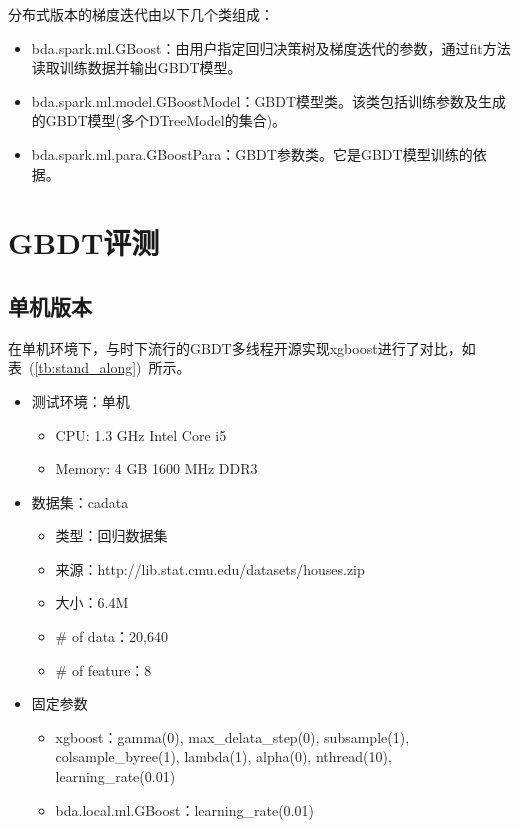 \documentclass[a4paper,11pt,         %
               ]{article}
\begin{document}
分布式版本的梯度迭代由以下几个类组成：
\begin{itemize}
	\item bda.spark.ml.GBoost：由用户指定回归决策树及梯度迭代的参数，通过fit方法读取训练数据并输出GBDT模型。
	\item bda.spark.ml.model.GBoostModel：GBDT模型类。该类包括训练参数及生成的GBDT模型(多个DTreeModel的集合)。
	\item bda.spark.ml.para.GBoostPara：GBDT参数类。它是GBDT模型训练的依据。
\end{itemize}

\section{GBDT评测}

\subsection{单机版本}

在单机环境下，与时下流行的GBDT多线程开源实现xgboost进行了对比，如表~(\ref{tb:stand_along})~所示。

\begin{itemize}
	\item 测试环境：单机
		\begin{itemize}
			\item CPU: 1.3 GHz Intel Core i5
			\item Memory: 4 GB 1600 MHz DDR3
		\end{itemize}
	\item 数据集：cadata
		\begin{itemize}
			\item 类型：回归数据集
			\item 来源：http://lib.stat.cmu.edu/datasets/houses.zip
			\item 大小：6.4M
			\item \# of data：20,640
			\item \# of feature：8
		\end{itemize}
	\item 固定参数
		\begin{itemize}
			\item xgboost：gamma(0), max\_delata\_step(0), subsample(1), colsample\_byree(1), lambda(1), alpha(0), nthread(10), learning\_rate(0.01)
			\item bda.local.ml.GBoost：learning\_rate(0.01)
		\end{itemize}
\end{itemize}
\end{document}

